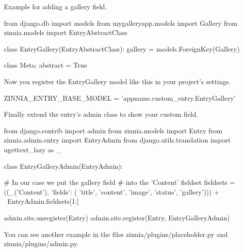 Example for adding a gallery field.

from django.db import models
from mygalleryapp.models import Gallery
from zinnia.models import EntryAbstractClass

class EntryGallery(EntryAbstractClass):
  gallery = models.ForeignKey(Gallery)

  class Meta:
    abstract = True

Now you register the EntryGallery model like this in your project’s settings.

ZINNIA_ENTRY_BASE_MODEL = 'appname.custom_entry.EntryGallery'

Finally extend the entry’s admin class to show your custom field.

from django.contrib import admin
from zinnia.models import Entry
from zinnia.admin.entry import EntryAdmin
from django.utils.translation import ugettext_lazy as _

class EntryGalleryAdmin(EntryAdmin):

  # In our case we put the gallery field
  # into the 'Content' fieldset
  fieldsets = ((_('Content'), {'fields': (
    'title', 'content', 'image', 'status', 'gallery')})) + \
    EntryAdmin.fieldsets[1:]

admin.site.unregister(Entry)
admin.site.register(Entry, EntryGalleryAdmin)

You can see another example in the files zinnia/plugins/placeholder.py and zinnia/plugins/admin.py.

